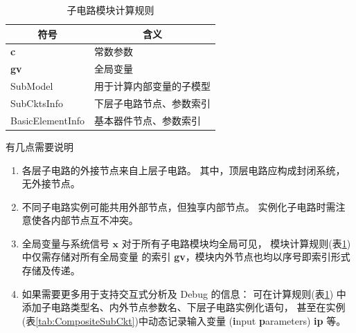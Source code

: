 \begin{table}[htbp]
  \centering
  \caption{子电路模块计算规则}\label{tab:BasicCompositeSubCktRule}
  \begin{tabular}{l|l}
    \hline
    \multicolumn{1}{c|}{符号} & \multicolumn{1}{c}{含义} \\
    \hline
    \textbf{c}       & 常数参数                                    \\
    \textbf{gv}      & 全局变量                                    \\
    SubModel         & 用于计算内部变量的子模型 \\
    SubCktsInfo      & 下层子电路节点、参数索引 \\
    BasicElementInfo & 基本器件节点、参数索引 \\
    \hline
  \end{tabular}
\end{table}
有几点需要说明
\begin{enumerate}[partopsep=0pt,topsep=0pt,itemsep=0pt,parsep=0pt]
  \item 各层子电路的外接节点来自上层子电路。
    其中，顶层电路应构成封闭系统，无外接节点。
  \item 不同子电路实例可能共用外部节点，但独享内部节点。
    实例化子电路时需注意使各内部节点互不冲突。
  \item 全局变量与系统信号 $\bm{x}$ 对于所有子电路模块均全局可见，
    模块计算规则(表\ref{tab:BasicCompositeSubCktRule})中仅需存储对所有全局变量
    的索引 \textbf{gv}，模块内外节点也均以序号即索引形式存储及传递。
  \item 如果需要更多用于支持交互式分析及 Debug 的信息：
    可在计算规则(表\ref{tab:BasicCompositeSubCktRule})
    中添加子电路类型名、内外节点参数名、下层子电路实例化语句，
    甚至在实例(表\ref{tab:CompositeSubCkt})中动态记录输入变量
    (\textbf{i}nput \textbf{p}arameters) \textbf{ip} 等。
\end{enumerate}

